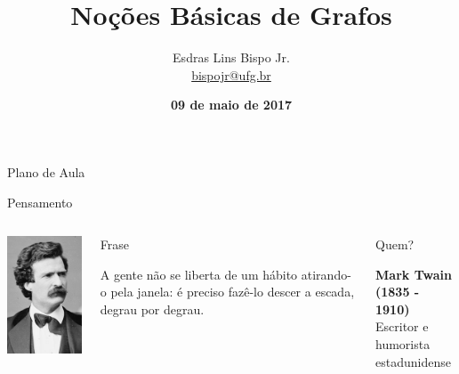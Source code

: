 \documentclass[xcolor=dvipsnames,table]{beamer}
\title{Noções Básicas de Grafos}
\author{
  Esdras Lins Bispo Jr. \\ \url{bispojr@ufg.br}
  }
\institute{
  Teoria de Grafos \\Bacharelado em Ciência da Computação}
\date{\textbf{09 de maio de 2017} }
\begin{document}
	\begin{frame}
		\titlepage
	\end{frame}

	\AtBeginSection{
		\begin{frame}{Sumário}%
    		\tableofcontents[currentsection]
		\end{frame}
	}

	\begin{frame}{Plano de Aula}
		\tableofcontents
	\end{frame}
    
    \begin{frame}{Pensamento}
		\begin{columns}
		  		\begin{center}
		    		\includegraphics[height=.8\textheight]{images/mark.jpg}
		  		\end{center}
				\begin{block}{Frase}
					\begin{center}
						{\large A gente não se liberta de um hábito atirando-o pela janela: é preciso fazê-lo descer a escada, degrau por degrau.}
					\end{center}
				\end{block}		  		
		  		\begin{block}{Quem?}
		  			\begin{center}
						{\bf Mark Twain (1835 - 1910)} \\Escritor e humorista estadunidense
					\end{center}
				\end{block}
		\end{columns}
	\end{frame}
    
\end{document}
